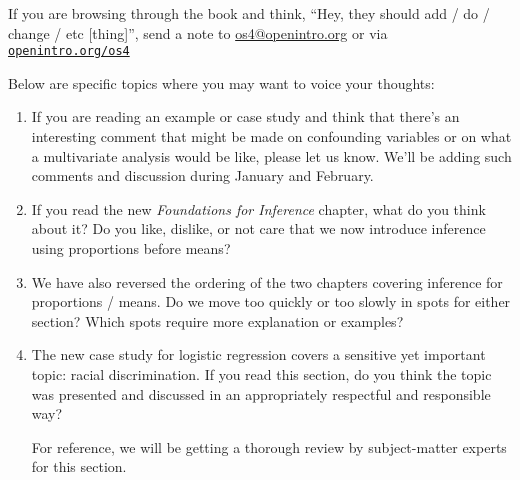 \noindent%
If you are browsing through the book and think,
``Hey, they should add / do / change / etc [thing]'',
send a note to \url{os4@openintro.org}
or via
\href{http://www.openintro.org/os4}{\texttt{openintro.org/os4}}
\vspace{3mm}

\noindent%
Below are specific topics where you may
want to voice your thoughts:
\begin{enumerate}
\item
    If you are reading an example
    or case study and think that there's an
    interesting comment that might be made on
    confounding variables or on what a multivariate
    analysis would be like, please let us know.
    We'll be adding such comments and discussion
    during January and February.
\item
    If you read the new
    \emph{Foundations for Inference} chapter,
    what do you think about it?
    Do you like, dislike, or not care that we
    now introduce inference using proportions
    before means?
\item
    We have also reversed the ordering of the two chapters
    covering inference for proportions / means.
    Do we move too quickly or too slowly in spots
    for either section?
    Which spots require more explanation or examples?
\item
    The new case study for logistic regression
    covers a sensitive yet important topic:
    racial discrimination.
    If you read this section, do you think the
    topic was presented and discussed in an
    appropriately respectful and responsible way?

    For reference, we will be getting a thorough
    review by subject-matter experts for this section.
    
\end{enumerate}


